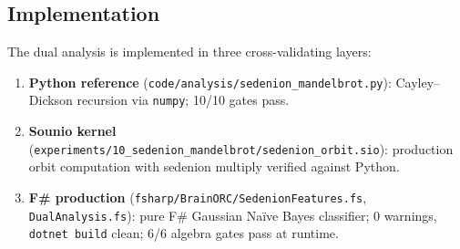 \documentclass[11pt,a4paper]{article}
\begin{document}
\subsection{Implementation}

The dual analysis is implemented in three cross-validating layers:
\begin{enumerate}
\item \textbf{Python reference} (\texttt{code/analysis/sedenion\_mandelbrot.py}): Cayley--Dickson recursion via \texttt{numpy}; 10/10 gates pass.
\item \textbf{Sounio kernel} (\texttt{experiments/10\_sedenion\_mandelbrot/sedenion\_orbit.sio}): production orbit computation with sedenion multiply verified against Python.
\item \textbf{F\# production} (\texttt{fsharp/BrainORC/SedenionFeatures.fs}, \texttt{DualAnalysis.fs}): pure F\# Gaussian Na\"ive Bayes classifier; 0 warnings, \texttt{dotnet build} clean; 6/6 algebra gates pass at runtime.
\end{enumerate}
\end{document}
